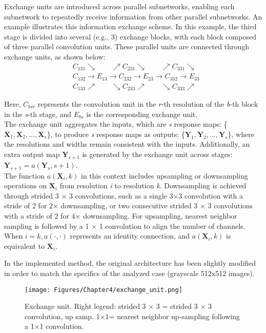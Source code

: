 Exchange units are introduced across parallel subnetworks, enabling each subnetwork to repeatedly receive information from other parallel subnetworks. An example illustrates this information exchange scheme. In this example, the third stage is divided into several (e.g., 3) exchange blocks, with each block composed of three parallel convolution units. These parallel units are connected through exchange units, as shown below:
\begin{equation}
\begin{aligned}
&C_{131} \searrow \quad\quad \nearrow C_{231} \searrow \quad\quad \nearrow C_{331} \searrow\\
&C_{132} \rightarrow E_{13}  \rightarrow C_{232} \rightarrow E_{23}  \rightarrow C_{332} \rightarrow E_{33}\\
&C_{133} \nearrow \quad\quad \searrow C_{233} \nearrow \quad\quad \searrow C_{333} \nearrow
\end{aligned}
\end{equation}

Here, $C_{bsr}$ represents the convolution unit in the \textit{r}-th resolution of the \textit{b}-th block in the \textit{s}-th stage, and $E_{bs}$ is the corresponding exchange unit.\\

The exchange unit aggregates the inputs, which are \textit{s} response maps: \{\(\textbf{X}_1, \textbf{X}_2, . . . , \textbf{X}_s\)\}, to produce \textit{s} response maps as outputs: \{\(\textbf{Y}_1, \textbf{Y}_2, . . . , \textbf{Y}_s\)\}, where the resolutions and widths remain consistent with the inputs. Additionally, an extra output map $\textbf{Y}_{s+1}$ is generated by the exchange unit across stages: $\textbf{Y}_{s+1} = a(\textbf{Y}_s, s + 1)$.\\

The function $a(\textbf{X}_i, k)$ in this context includes upsampling or downsampling operations on $\textbf{X}_i$ from resolution \textit{i} to resolution \textit{k}. Downsampling is achieved through strided 3 × 3 convolutions, such as a single 3×3 convolution with a stride of 2 for 2× downsampling, or two consecutive strided 3 × 3 convolutions with a stride of 2 for 4× downsampling. For upsampling, nearest neighbor sampling is followed by a 1 × 1 convolution to align the number of channels. When $i = k, a(\cdot, \cdot)$ represents an identity connection, and $a(\textbf{X}_i, k)$ is equivalent to $\textbf{X}_i$.

In the implemented method, the original architecture has been slightly modified in order to match the specifics of the analyzed case (grayscale 512x512 images).
\begin{figure}[th]
    \centering
    \texttt{[image: Figures/Chapter4/exchange\_unit.png]}
    \caption[Exchange Unit]{Exchange unit. Right legend: strided 3 × 3 = strided 3 × 3 convolution, up samp. 1×1= nearest neighbor up-sampling following a 1×1 convolution.}
    \label{fig:Exchange Unit}
\end{figure}

